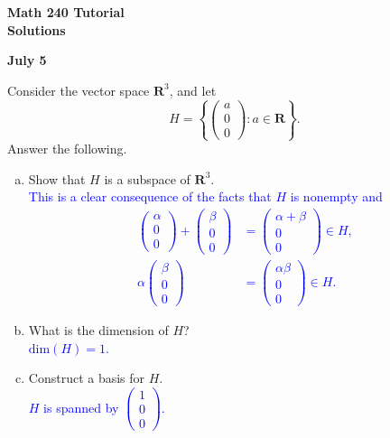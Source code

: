 \documentclass[a4paper,11pt]{article}
\newcommand{\R}{\mathbf{R}}
\newcommand{\ddim}{\text{dim}}
\newcommand{\BB}[1]{\textcolor{blue}{#1}}
\begin{document}
\begin{center}
  {\Large\bfseries Math 240 Tutorial \\ Solutions}
\end{center}
\begin{center}
  {\bfseries July 5}
\end{center}

 Consider the vector space $\R^3$, and let
\[
  H=\left\{
    \begin{pmatrix}a\\0\\0\end{pmatrix}
    : a \in \R
  \right\}.
\]
Answer the following.
\begin{enumerate}[(a)]
\item Show that $H$ is a subspace of $\R^3$. \\

  \BB{This is a clear consequence of the facts that $H$ is nonempty and
    \begin{align*}
      \begin{pmatrix}\alpha\\0\\0\end{pmatrix}+
      \begin{pmatrix}\beta\\0\\0\end{pmatrix} &=
      \begin{pmatrix}\alpha+\beta\\0\\0\end{pmatrix} \in H, \\
      \alpha\begin{pmatrix}\beta\\0\\0\end{pmatrix} &=
      \begin{pmatrix}\alpha\beta\\0\\0\end{pmatrix} \in H.
    \end{align*}
    }
  
\item What is the dimension of $H$? \\

  \BB{$\ddim(H)=1$.}

\item Construct a basis for $H$. \\

  \BB{$H$ is spanned by $\left( \begin{smallmatrix}1\\0\\0\end{smallmatrix}
    \right)$. \\}
\end{enumerate}
\end{document}
